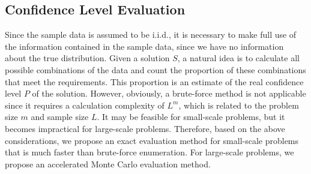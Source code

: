 \documentclass[lettersize,journal]{IEEEtran}
\begin{document}
\subsection{Confidence Level Evaluation}
Since the sample data is assumed to be i.i.d., it is necessary to make full use of the information contained in the sample data, since we have no information about the true distribution. 
Given a solution $S$, a natural idea is to calculate all possible combinations of the data and count the proportion of these combinations that meet the requirements. 
This proportion is an estimate of the real confidence level $P$ of the solution. 
However, obviously, a brute-force method is not applicable since it requires a calculation complexity of $L^m$, which is related to the problem size $m$ and sample size $L$. 
It may be feasible for small-scale problems, but it becomes impractical for large-scale problems. 
Therefore, based on the above considerations, we propose an exact evaluation method for small-scale problems that is much faster than brute-force enumeration. 
For large-scale problems, we propose an accelerated Monte Carlo evaluation method.
\end{document}
